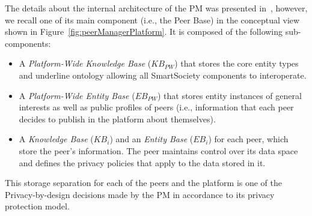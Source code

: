 The details about the internal architecture of the PM was presented in~\cite{D4.2,Hartswood:2015fe}, however, we recall one of its main component (i.e., the Peer Base) in the conceptual view shown in Figure~\ref{fig:peerManagerPlatform}. It is composed of the following sub-components: 
\begin{itemize}
\item A \emph{Platform-Wide Knowledge Base} (${KB}_{PW}$) that stores the core entity types and underline ontology allowing all SmartSociety components to interoperate. 
\item A \emph{Platform-Wide Entity Base} (${EB}_{PW}$) that stores entity instances of general interests as well as public profiles of peers (i.e., information that each peer decides to publish in the platform about themselves).
\item A \emph{Knowledge Base} (${KB}_i$) and an \emph{Entity Base} (${EB}_i$) for each peer, which store the peer’s information. The peer maintains control over its data space and defines the privacy policies that apply to the data stored in it. 
\end{itemize}
This storage separation for each of the peers and the platform is one of the Privacy-by-design decisions made by the PM in accordance to its privacy protection model.
%

